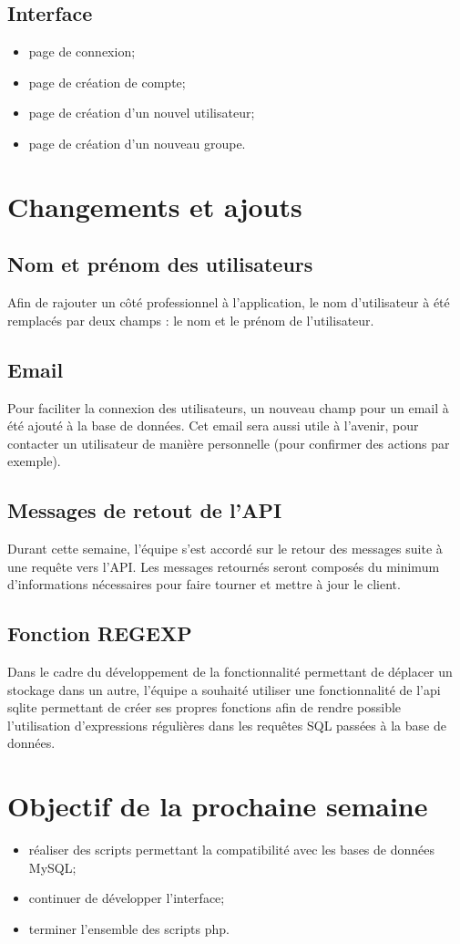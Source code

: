 \documentclass[a4paper, 12pt]{report}
\begin{document}
		\section{Interface}
			\begin{itemize}
				\item page de connexion;
				\item page de création de compte;
				\item page de création d’un nouvel utilisateur;
				\item page de création d’un nouveau groupe.
			\end{itemize}

	\chapter{Changements et ajouts}			
		\section{Nom et prénom des utilisateurs}
			Afin de rajouter un côté professionnel à l’application, le nom d’utilisateur à été remplacés par deux champs : le nom et le prénom de l’utilisateur.

		\section{Email}
			Pour faciliter la connexion des utilisateurs, un nouveau champ pour un email à été ajouté à la base de données. Cet email sera aussi utile à l’avenir, pour contacter un utilisateur de manière personnelle (pour confirmer des actions par exemple).

		\section{Messages de retout de l'API}
			Durant cette semaine, l’équipe s’est accordé sur le retour des messages suite à une requête vers l’API. Les messages retournés seront composés du minimum d’informations nécessaires pour faire tourner et  mettre à jour le client.


		\section{Fonction REGEXP}
    		Dans le cadre du développement de la fonctionnalité permettant de déplacer un stockage dans un autre, l’équipe a souhaité utiliser une fonctionnalité de l’api sqlite permettant de créer ses propres fonctions afin de rendre possible l’utilisation d’expressions régulières dans les requêtes SQL passées à la base de données.

    \chapter{Objectif de la prochaine semaine}
    	\begin{itemize}
    		\item réaliser des scripts permettant la compatibilité avec les bases de données MySQL;
    		\item continuer de développer l'interface;
    		\item terminer l'ensemble des scripts php.
    	\end{itemize}
		
\end{document}
